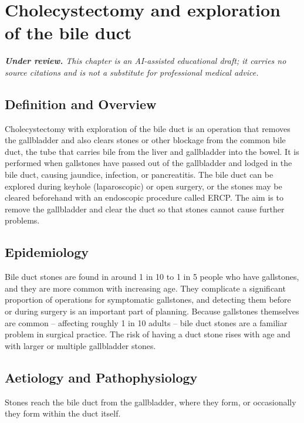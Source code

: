 \chapter{Cholecystectomy and exploration of the bile duct}

\medskip
\noindent\textit{\textbf{Under review.} This chapter is an AI-assisted educational draft; it carries no source citations and is not a substitute for professional medical advice.}

\section*{Definition and Overview}
Cholecystectomy with exploration of the bile duct is an operation that removes the gallbladder and also clears stones or other blockage from the common bile duct, the tube that carries bile from the liver and gallbladder into the bowel. It is performed when gallstones have passed out of the gallbladder and lodged in the bile duct, causing jaundice, infection, or pancreatitis. The bile duct can be explored during keyhole (laparoscopic) or open surgery, or the stones may be cleared beforehand with an endoscopic procedure called ERCP. The aim is to remove the gallbladder and clear the duct so that stones cannot cause further problems.

\section*{Epidemiology}
Bile duct stones are found in around 1 in 10 to 1 in 5 people who have gallstones, and they are more common with increasing age. They complicate a significant proportion of operations for symptomatic gallstones, and detecting them before or during surgery is an important part of planning. Because gallstones themselves are common -- affecting roughly 1 in 10 adults -- bile duct stones are a familiar problem in surgical practice. The risk of having a duct stone rises with age and with larger or multiple gallbladder stones.

\section*{Aetiology and Pathophysiology}
Stones reach the bile duct from the gallbladder, where they form, or occasionally they form within the duct itself.

